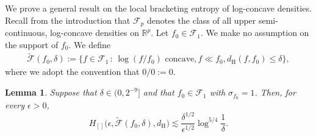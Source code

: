 \documentclass[a4paper,12pt]{article}
\newtheorem{lemma}[theorem]{Lemma}
\begin{document}
We prove a general result on the local bracketing entropy of log-concave densities.
Recall from the introduction that $\mathcal{F}_p$ denotes the class of all upper semi-continuous, log-concave densities on $\mathbb{R}^p$. Let $f_0 \in \mathcal{F}_1$. We make no assumption on the support of $f_0$. We define
\begin{align}
  \tilde{\mathcal{F}}(f_0, \delta) := \bigl\{ f \in \mathcal{F}_1 \,:\, \log (f/f_0) \textrm{ concave}, f \ll f_0, d_{\mathrm{H}}(f,f_0) \leq \delta\bigr\}, \label{eqn:local_density_ball}
\end{align}
where we adopt the convention that $0/0 := 0$.  %

\begin{lemma}
  \label{Prop:GeneralLocalBracketing}
  Suppose that $\delta \in (0,2^{-9}]$ and that $f_0 \in \mathcal{F}_1$ with $\sigma_{f_0}=1$. Then, for every $\epsilon > 0$,
  \[
    H_{[]}\bigl(\epsilon, \tilde{\mathcal{F}}(f_0, \delta), d_{\mathrm{H}}\bigr) \lesssim \frac{\delta^{1/2}}{\epsilon^{1/2}} \log^{5/4} \frac{1}{\delta}.
  \]
\end{lemma}
\end{document}
